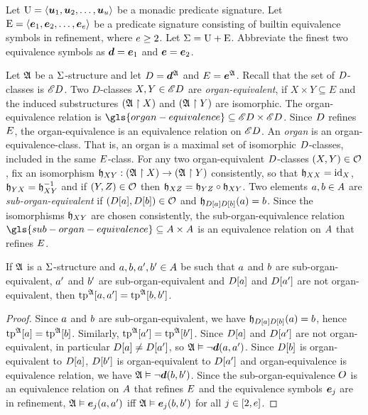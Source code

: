 Let $\mathrm{U} = \left\langle \bm{u}_{1},\bm{u}_{2},\dots,\bm{u}_{u} \right\rangle$ be a monadic predicate signature.
Let $\mathrm{E} = \left\langle \bm{e}_{1},\bm{e}_{2},\dots,\bm{e}_{e} \right\rangle$ be a predicate signature consisting
of builtin equivalence symbols in refinement, where $e \geq 2$.
Let $\mathrm{\Sigma} = \mathrm{U} + \mathrm{E}$.
Abbreviate the finest two equivalence symbols as $\bm{d} = \bm{e}_{1}$ and $\bm{e} =
\bm{e}_{2}$.

\begin{definition}
Let $\mathfrak{A}$ be a $\mathrm{\Sigma}$-structure and let $D = \bm{d}^{\mathfrak{A}}$ and
$E = \bm{e}^{\mathfrak{A}}$.
Recall that the set of $D$-classes is ${\mathscr{E}D}$.
Two $D$-classes $X, Y \in {\mathscr{E}D}$ are \emph{organ-equivalent},
if $X \times Y \subseteq E$ and the induced substructures 
$(\mathfrak{A} \restriction X)$ and $(\mathfrak{A} \restriction Y)$ are isomorphic.
The organ-equivalence relation is
$\gls{organ-equivalence} \subseteq \domXX{\Ecl\relD}$.
Since $D$ refines $E$, the organ-equivalence is an equivalence relation
on ${\mathscr{E}D}$.
An \emph{organ} is an organ-equivalence-class. That is, an organ
is a maximal set of isomorphic $D$-classes, included in the same
$E$-class.
For any two organ-equivalent $D$-classes $(X, Y) \in \mathcal{O}$,
fix an isomorphism
$\mathfrak{h}_{XY} : (\mathfrak{A} \restriction X) \to (\mathfrak{A} \restriction Y)$
consistently, so that $\mathfrak{h}_{XX} = \operatorname{id}_{X}$,
$\mathfrak{h}_{YX} = \mathfrak{h}_{XY}^{-1}$
and if $(Y, Z) \in \mathcal{O}$ then
$\mathfrak{h}_{XZ} = \mathfrak{h}_{YZ} \circ \mathfrak{h}_{XY}$.
Two elements $a, b \in A$ are \emph{sub-organ-equivalent}
if $(D[a], D[b]) \in \mathcal{O}$ and
$\mathfrak{h}_{D[a]D[b]}(a) = b$.
Since the isomorphisms $\mathfrak{h}_{XY}$ are chosen consistently, the
sub-organ-equivalence relation
$\gls{sub-organ-equivalence} \subseteq \domAA$ is an equivalence relation on
$A$ that refines $E$.
\end{definition}

\begin{remark}\label{rem:twovar-same-organ-tp2}
If $\mathfrak{A}$ is a $\mathrm{\Sigma}$-structure and $a, b, {a'}, {b'} \in A$ be such
that $a$ and $b$ are sub-organ-equivalent, ${a'}$ and ${b'}$ are
sub-organ-equivalent and $D[a]$ and $D[{a'}]$ are not
organ-equivalent, then $\operatorname{tp}^{\mathfrak{A}}[a,{a'}] = \operatorname{tp}^{\mathfrak{A}}[b,{b'}]$.
\end{remark}
\begin{proof}
Since $a$ and $b$ are sub-organ-equivalent, we have
$\mathfrak{h}_{D[a]D[b]}(a) = b$,
hence $\operatorname{tp}^{\mathfrak{A}}[a] = \operatorname{tp}^{\mathfrak{A}}[b]$.
Similarly, $\operatorname{tp}^{\mathfrak{A}}[{a'}] = \operatorname{tp}^{\mathfrak{A}}[{b'}]$.
Since $D[a]$ and $D[{a'}]$ are not organ-equivalent,
in particular $D[a] \neq D[{a'}]$,
so $\mathfrak{A} \vDash \lnot \bm{d}(a,{a'})$.
Since $D[b]$ is organ-equivalent to $D[a]$, $D[{b'}]$ is
organ-equivalent to $D[{a'}]$ and organ-equivalence is equivalence relation,
we have $\mathfrak{A} \vDash \lnot \bm{d}(b, {b'})$.
Since the sub-organ-equivalence $O$ is an equivalence relation on $A$
that refines $E$ and the equivalence symbols $\bm{e}_{j}$ are in refinement,
$\mathfrak{A} \vDash \bm{e}_{j}(a, {a'})$  iff $\mathfrak{A} \vDash \bm{e}_{j}(b, {b'})$ for all 
$j \in [2,e]$.
\end{proof}


